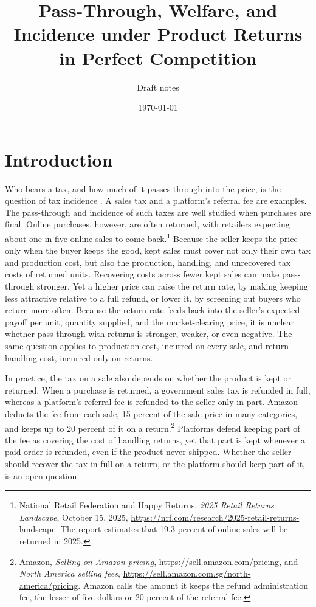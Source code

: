 \documentclass[11pt]{article}
\title{Pass-Through, Welfare, and Incidence under Product Returns\\
  in Perfect Competition}
\author{Draft notes}
\date{\today}
\begin{document}
\maketitle

\section{Introduction}

Who bears a tax, and how much of it passes through into the price, is the
question of tax incidence \citep{weyl2013pass}. A sales tax and a platform's
referral fee are examples. The pass-through and incidence of such taxes are
well studied when purchases are final. Online purchases, however, are often
returned, with retailers expecting about one in five online sales to come
back.\footnote{National Retail
  Federation and Happy Returns, \emph{2025 Retail Returns Landscape}, October
  15, 2025, \url{https://nrf.com/research/2025-retail-returns-landscape}.
  The report estimates that 19.3 percent of online sales will be returned in
  2025.} Because the seller keeps the price only when the buyer keeps the good,
kept sales must cover not only their own tax and production cost, but also the
production, handling, and unrecovered tax costs of returned units. Recovering costs across fewer kept sales can make pass-through stronger. Yet a
higher price can raise the return rate, by making keeping less attractive
relative to a full refund, or lower it, by screening out buyers who return
more often. Because the return rate feeds back into the seller's expected
payoff per unit, quantity supplied, and the market-clearing price, it is
unclear whether pass-through with returns is stronger, weaker, or even
negative. The same question applies to production cost, incurred on every
sale, and return handling cost, incurred only on returns.

In practice, the tax on a sale also depends on whether the product is kept or
returned. When a purchase is returned, a government sales tax is refunded in
full, whereas a platform's referral fee is refunded to the seller only in
part. Amazon deducts the fee from each sale, 15 percent of the sale price in
many categories, and keeps up to 20 percent of it on a return.\footnote{Amazon,
  \emph{Selling on Amazon pricing},
  \url{https://sell.amazon.com/pricing}, and \emph{North America selling fees},
  \url{https://sell.amazon.com.sg/north-america/pricing}. Amazon calls the
  amount it keeps the refund administration fee, the lesser of five dollars or
  20 percent of the referral fee.} Platforms defend keeping part of the fee as
covering the cost of handling returns, yet that part is kept whenever a paid
order is refunded, even if the product never shipped. Whether the seller
should recover the tax in full on a return, or the platform should keep part
of it, is an open question.
\end{document}
